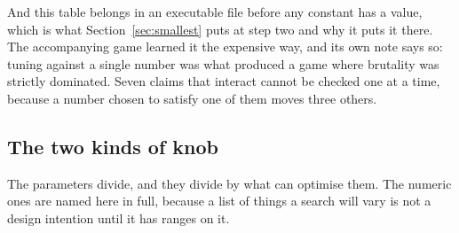 \documentclass[11pt,a4paper]{article}
\begin{document}
\begin{sectionbox}
And this table belongs in an executable file before any constant has a value, which is what
Section~\ref{sec:smallest} puts at step two and why it puts it there. The accompanying game learned
it the expensive way, and its own note says so: tuning against a single number was what produced a
game where brutality was strictly dominated. Seven claims that interact cannot be checked one at a
time, because a number chosen to satisfy one of them moves three others.
\end{sectionbox}

\subsection{The two kinds of knob}
\label{sec:knobs}

The parameters divide, and they divide by what can optimise them. The numeric ones are named here
in full, because a list of things a search will vary is not a design intention until it has ranges
on it.
\end{document}
